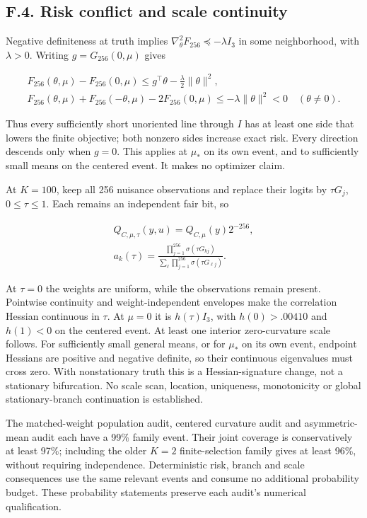 \documentclass{article}
\begin{document}
\subsection*{F.4. Risk conflict and scale
continuity}\label{f.4.-risk-conflict-and-scale-continuity}

Negative definiteness at truth implies
\(\nabla_\theta^2F_{256}\preceq-\lambda I_3\) in some neighborhood, with
\(\lambda>0\). Writing \(g=G_{256}(0,\mu)\) gives

\[
\begin{gathered}
F_{256}(\theta,\mu)-F_{256}(0,\mu)
\le g^\top\theta-\frac\lambda2\|\theta\|^2,\\
F_{256}(\theta,\mu)+F_{256}(-\theta,\mu)-2F_{256}(0,\mu)
\le-\lambda\|\theta\|^2<0\quad(\theta\ne0).
\end{gathered}
\tag{F.11}
\]

Thus every sufficiently short unoriented line through \(I\) has at least
one side that lowers the finite objective; both nonzero sides increase
exact risk. Every direction descends only when \(g=0\). This applies at
\(\mu_*\) on its own event, and to sufficiently small means on the
centered event. It makes no optimizer claim.

At \(K=100\), keep all 256 nuisance observations and replace their
logits by \(\tau G_j\), \(0\le\tau\le1\). Each remains an independent
fair bit, so

\[
\begin{gathered}
Q_{C,\mu,\tau}(y,u)=Q_{C,\mu}(y)2^{-256},\\
a_k(\tau)=\frac{\prod_{j=1}^{256}\sigma(\tau G_{kj})}
{\sum_\ell\prod_{j=1}^{256}\sigma(\tau G_{\ell j})}.
\end{gathered}
\tag{F.12}
\]

At \(\tau=0\) the weights are uniform, while the observations remain
present. Pointwise continuity and weight-independent envelopes make the
correlation Hessian continuous in \(\tau\). At \(\mu=0\) it is
\(h(\tau)I_3\), with \(h(0)>.00410\) and \(h(1)<0\) on the centered
event. At least one interior zero-curvature scale follows. For
sufficiently small general means, or for \(\mu_*\) on its own event,
endpoint Hessians are positive and negative definite, so their
continuous eigenvalues must cross zero. With nonstationary truth this is
a Hessian-signature change, not a stationary bifurcation. No scale scan,
location, uniqueness, monotonicity or global stationary-branch
continuation is established.

The matched-weight population audit, centered curvature audit and
asymmetric-mean audit each have a 99\% family event. Their joint
coverage is conservatively at least 97\%; including the older \(K=2\)
finite-selection family gives at least 96\%, without requiring
independence. Deterministic risk, branch and scale consequences use the
same relevant events and consume no additional probability budget. These
probability statements preserve each audit's numerical qualification.
\end{document}
